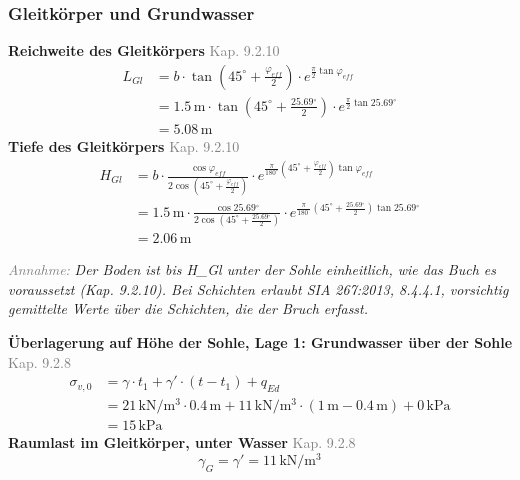 \documentclass[11pt,a4paper]{article}
\newcommand{\normref}[1]{{\small\textcolor{gray}{#1}}}
\newcommand{\hinweis}[2]{\par\noindent\textcolor{gray}{\textit{#1:}} \textit{#2}\par}
\begin{document}
\subsubsection{Gleitkörper und Grundwasser}
\noindent\textbf{Reichweite des Gleitkörpers} \hfill \normref{Kap. 9.2.10}
\begin{equation*}
\begin{aligned}
  L_{Gl} &= b \cdot \tan\left(45^\circ + \frac{\varphi_{eff}}{2}\right) \cdot e^{\frac{\pi}{2} \tan \varphi_{eff}} \\
  &= 1.5\,\mathrm{m} \cdot \tan\left(45^\circ + \frac{25.69{}^{\circ}}{2}\right) \cdot e^{\frac{\pi}{2} \tan 25.69{}^{\circ}} \\
  &= 5.08\,\mathrm{m}
\end{aligned}
\end{equation*}
\noindent\textbf{Tiefe des Gleitkörpers} \hfill \normref{Kap. 9.2.10}
\begin{equation*}
\begin{aligned}
  H_{Gl} &= b \cdot \frac{\cos \varphi_{eff}}{2 \cos\left(45^\circ + \frac{\varphi_{eff}}{2}\right)} \cdot e^{\frac{\pi}{180^\circ}\left(45^\circ + \frac{\varphi_{eff}}{2}\right) \tan \varphi_{eff}} \\
  &= 1.5\,\mathrm{m} \cdot \frac{\cos 25.69{}^{\circ}}{2 \cos\left(45^\circ + \frac{25.69{}^{\circ}}{2}\right)} \cdot e^{\frac{\pi}{180^\circ}\left(45^\circ + \frac{25.69{}^{\circ}}{2}\right) \tan 25.69{}^{\circ}} \\
  &= 2.06\,\mathrm{m}
\end{aligned}
\end{equation*}
\hinweis{Annahme}{Der Boden ist bis H\_Gl unter der Sohle einheitlich, wie das Buch es voraussetzt (Kap. 9.2.10). Bei Schichten erlaubt SIA 267:2013, 8.4.4.1, vorsichtig gemittelte Werte über die Schichten, die der Bruch erfasst.}
\noindent\textbf{Überlagerung auf Höhe der Sohle, Lage 1: Grundwasser über der Sohle} \hfill \normref{Kap. 9.2.8}
\begin{equation*}
\begin{aligned}
  \sigma_{v,0} &= \gamma \cdot t_1 + \gamma' \cdot \left(t - t_1\right) + q_{Ed} \\
  &= 21\,\mathrm{kN}/\mathrm{m}^{3} \cdot 0.4\,\mathrm{m} + 11\,\mathrm{kN}/\mathrm{m}^{3} \cdot \left(1\,\mathrm{m} - 0.4\,\mathrm{m}\right) + 0\,\mathrm{kPa} \\
  &= 15\,\mathrm{kPa}
\end{aligned}
\end{equation*}
\noindent\textbf{Raumlast im Gleitkörper, unter Wasser} \hfill \normref{Kap. 9.2.8}
\begin{equation*}
\gamma_G = \gamma' = 11\,\mathrm{kN}/\mathrm{m}^{3}
\end{equation*}
\end{document}
